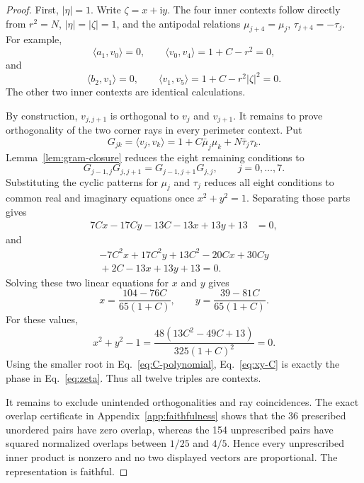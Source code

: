 \documentclass[twocolumn,aps,pra,floatfix,amsmath,amssymb,longbibliography]{revtex4-2}
\theoremstyle{definition}
\theoremstyle{remark}
\newcommand{\ii}{\mathrm{i}}
\begin{document}
\begin{proof}
First, $|\eta|=1$.  Write $\zeta=x+\ii y$.  The four inner contexts
follow directly from $r^2=N$, $|\eta|=|\zeta|=1$, and the antipodal
relations $\mu_{j+4}=\mu_j$, $\tau_{j+4}=-\tau_j$.  For example,
\[
 \langle a_1,v_0\rangle=0,\qquad
 \langle v_0,v_4\rangle=1+C-r^2=0,
\]
and
\[
 \langle b_2,v_1\rangle=0,\qquad
 \langle v_1,v_5\rangle=1+C-r^2|\zeta|^2=0.
\]
The other two inner contexts are identical calculations.

By construction, $v_{j,j+1}$ is orthogonal to $v_j$ and $v_{j+1}$.
It remains to prove orthogonality of the two corner rays in every
perimeter context.  Put
\[
 G_{jk}=\langle v_j,v_k\rangle
 =1+C\bar\mu_j\mu_k+N\bar\tau_j\tau_k.
\]
Lemma~\ref{lem:gram-closure} reduces the eight remaining conditions to
\begin{equation}
 G_{j-1,j}G_{j,j+1}=G_{j-1,j+1}G_{j,j},
 \qquad j=0,\ldots,7.
 \label{eq:h20-closure}
\end{equation}
Substituting the cyclic patterns for $\mu_j$ and $\tau_j$ reduces all eight
conditions to common real and imaginary equations once $x^2+y^2=1$.
Separating those parts gives
\begin{align}
 7Cx-17Cy-13C-13x+13y+13&=0,
 \label{eq:closure-real}
\end{align}
and
\begin{multline}
 -7C^2x+17C^2y+13C^2-20Cx+30Cy\\
 {}+2C-13x+13y+13=0.
 \label{eq:closure-imag}
\end{multline}
Solving these two linear equations for $x$ and $y$ gives
\begin{equation}
 x=\frac{104-76C}{65(1+C)},\qquad
 y=\frac{39-81C}{65(1+C)}.
 \label{eq:xy-C}
\end{equation}
For these values,
\begin{equation}
 x^2+y^2-1=
 \frac{48(13C^2-49C+13)}{325(1+C)^2}=0.
 \label{eq:zeta-unit}
\end{equation}
Using the smaller root in Eq.~\eqref{eq:C-polynomial},
Eq.~\eqref{eq:xy-C} is exactly the phase in Eq.~\eqref{eq:zeta}.
Thus all twelve triples are contexts.

It remains to exclude unintended orthogonalities and ray coincidences.
The exact overlap certificate in Appendix~\ref{app:faithfulness} shows
that the 36 prescribed unordered pairs have zero overlap, whereas the
154 unprescribed pairs have squared normalized overlaps between $1/25$
and $4/5$.  Hence every unprescribed inner product is nonzero and no two
displayed vectors are proportional.  The representation is faithful.
\end{proof}
\end{document}
